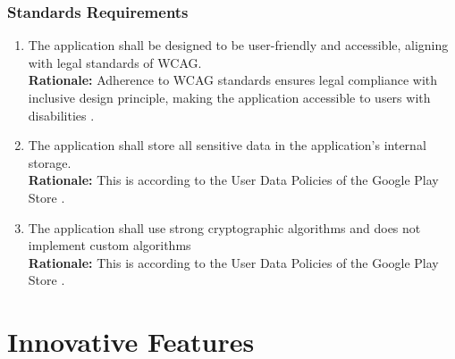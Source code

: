 \documentclass[]{article}
\begin{document}
\subsubsection{Standards Requirements}
\label{ssub:standards_requirements}
\begin{enumerate}[{LR-STD}1. ]
    \item The application shall be designed to be user-friendly and accessible, aligning with legal standards of WCAG. \\
    {\bf Rationale:} Adherence to WCAG standards ensures legal compliance with inclusive design principle, making the application accessible to users with disabilities
    \cite{2c}.
    \item The application shall store all sensitive data in the application's internal storage. \\
    {\bf Rationale:} This is according to the User Data Policies of the Google Play Store
    \cite{11c}.
    \item The application shall use strong cryptographic algorithms and does not implement custom algorithms \\
    {\bf Rationale:} This is according to the User Data Policies of the Google Play Store
    \cite{11c}.
\end{enumerate}



\section{Innovative Features}
\label{sec:innovative_features}
\end{document}
